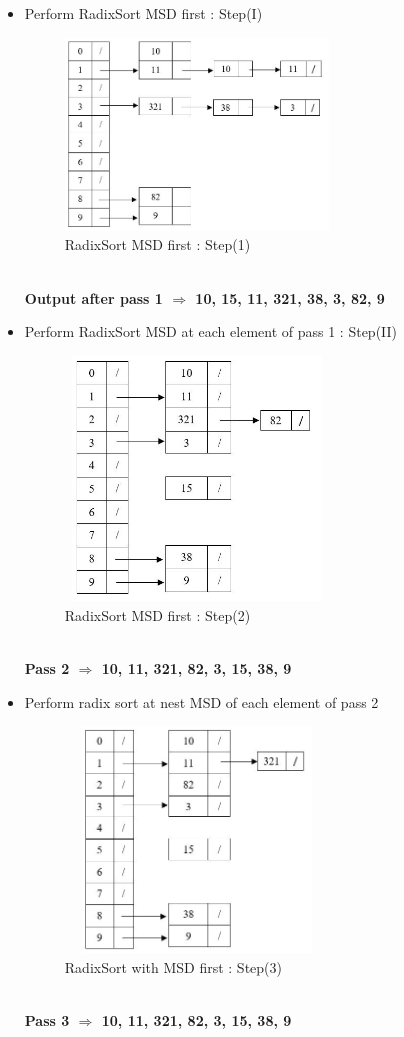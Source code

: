 \documentclass[11pt]{article}
\begin{document}
\begin{itemize}
	\item Perform RadixSort MSD first : Step(I)
		\begin{figure}[h]
			\centering
			\includegraphics[width=70mm]{radixsortMSD01.JPG}
			\caption{RadixSort MSD first : Step(1) \label{overflow}}
		\end{figure}
		\\
		\textbf{Output after pass 1 $\Rightarrow$ 10, 15, 11, 321, 38, 3, 82, 9}
		\newpage
	\item Perform RadixSort MSD at each element of pass 1 : Step(II) \newline
		\begin{figure}[h]
			\centering
			\includegraphics[width=70mm, height=65mm]{radixsortMSD02.JPG}
			\caption{RadixSort MSD first : Step(2) \label{overflow}}
		\end{figure}	
		\\
		\textbf{Pass 2 $\Rightarrow$ 10, 11, 321, 82, 3, 15, 38, 9}
	\item Perform radix sort at nest MSD of each element of pass 2
		\begin{figure}[h]
			\centering
			\includegraphics[width=70mm, height=60mm]{radixsortMSD03.JPG}
			\caption{RadixSort with MSD first : Step(3) \label{overflow}}
		\end{figure}	
		\\
		\textbf{Pass 3 $\Rightarrow$ 10, 11, 321, 82, 3, 15, 38, 9}
\end{itemize} 
\end{document}
